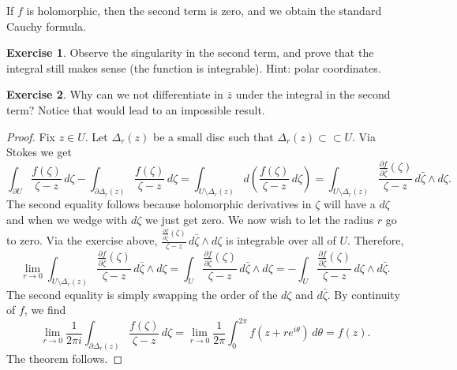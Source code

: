 \documentclass[12pt,openany]{book}
\newcommand{\R}{{\mathbb{R}}}
\theoremstyle{plain}
\theoremstyle{remark}
\theoremstyle{definition}
\newenvironment{exbox}{%
    \def\FrameCommand{\vrule width 1pt \relax\hspace {10pt}}%
    \MakeFramed {\advance \hsize -\width \FrameRestore }%
}{%
    \endMakeFramed
}
\theoremstyle{exercise}
\newtheorem{exercise}{Exercise}[section]
\theoremstyle{example}
\begin{document}
If $f$ is holomorphic, then the second term is zero, and we
obtain the standard Cauchy formula.

\begin{exbox}
\begin{exercise}
Observe the singularity in the second term, and prove that the integral still makes
sense (the function is integrable).  Hint: polar coordinates.
\end{exercise}

\begin{exercise}
Why can we not differentiate in $\bar{z}$ under the integral in the second
term?  Notice that would lead to an impossible result.
\end{exercise}
\end{exbox}

\begin{proof}
Fix $z \in U$.  Let $\Delta_r(z)$ be a small disc such that
$\Delta_r(z) \subset
\subset U$.
Via Stokes we get
\begin{equation*}
\int_{\partial U} \frac{f(\zeta)}{\zeta-z}\,  d\zeta - 
\int_{\partial \Delta_r(z)} \frac{f(\zeta)}{\zeta-z}\,  d\zeta
=
\int_{U \setminus \Delta_r(z)} d\left( \frac{f(\zeta)}{\zeta-z} \, d\zeta \right)
=
\int_{U \setminus \Delta_r(z)} \frac{\frac{\partial f}{\partial
\bar{\zeta}}(\zeta)}{\zeta-z} \, d\bar{\zeta} \wedge d\zeta .
\end{equation*}
The second equality follows because holomorphic derivatives in $\zeta$
will have a $d\zeta$ and when we wedge with $d\zeta$ we just get zero.
We now wish to let the radius $r$ go to zero.
Via the exercise above,
$\frac{\frac{\partial f}{\partial \bar{\zeta}}(\zeta)}{\zeta-z} \, d\bar{\zeta} \wedge d\zeta$
is integrable over all of $U$.  Therefore,
\begin{equation*}
\lim_{r \to 0}
\int_{U \setminus \Delta_r(z)} \frac{\frac{\partial f}{\partial
\bar{\zeta}}(\zeta)}{\zeta-z} \, d\bar{\zeta} \wedge d\zeta
=
\int_{U} \frac{\frac{\partial f}{\partial
\bar{\zeta}}(\zeta)}{\zeta-z} \, d\bar{\zeta} \wedge d\zeta
=
-
\int_{U} \frac{\frac{\partial f}{\partial
\bar{\zeta}}(\zeta)}{\zeta-z} \, d\zeta \wedge d\bar{\zeta} .
\end{equation*}
The second equality is simply swapping the order of the $d\zeta$ and
$d\bar{\zeta}$.
By continuity of $f$, we find
\begin{equation*}
\lim_{r \to 0}
\frac{1}{2\pi i}
\int_{\partial \Delta_r(z)} \frac{f(\zeta)}{\zeta-z}\,  d\zeta
=
\lim_{r \to 0}
\frac{1}{2\pi}
\int_0^{2\pi} f(z + r e^{i\theta})\, d\theta
=
f(z) .
\end{equation*}
The theorem follows.
\end{proof}
\end{document}
